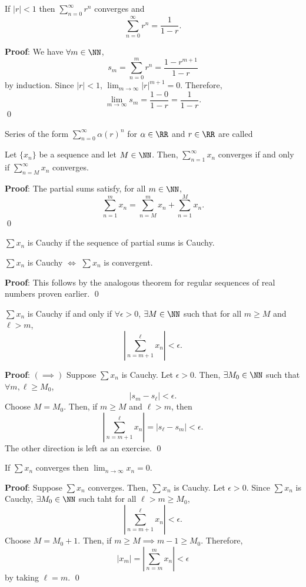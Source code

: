\begin{theorem}
If $|r| < 1$ then $\sum_{n=0}^\infty r^n$ converges and 
\[
\sum_{n=0}^\infty r^n = \frac{1}{1-r}.
\]
\end{theorem}
\textbf{Proof}: We have $\forall m\in \NN$, 
\[
s_m = \sum_{n=0}^m r^n = \frac{1-r^{m+1}}{1-r}
\]
by induction. Since $|r|<1$, $\lim_{m\to \infty} |r|^{m+1} = 0$. Therefore, 
\[
\lim_{m\to \infty} s_m = \frac{1-0}{1-r} = \frac{1}{1-r}.
\]\qed 

\begin{remark}
Series of the form $\sum_{n=0}^\infty \alpha (r)^{n}$ for $\alpha \in \RR$ and $r\in \RR$ are called 
\end{remark}

\begin{theorem}
Let $\{x_n\}$ be a sequence and let $M \in \NN$. Then, $\sum_{n=1}^\infty x_n$ converges if and only if $\sum_{n=M}^\infty x_n$ converges. 
\end{theorem}
\textbf{Proof}: The partial sums satisfy, for all $m\in \NN$, 
\[
\sum_{n=1}^m x_n = \sum_{n=M}^m x_n + \sum_{n=1}^M x_n.
\]
\qed 

\begin{definition}
$\sum x_n$ is Cauchy if the sequence of partial sums is Cauchy.
\end{definition}

\begin{theorem}
$\sum x_n$ is Cauchy $\iff$ $\sum x_n$ is convergent.
\end{theorem}
\textbf{Proof}: This follows by the analogous theorem for regular sequences of real numbers proven earlier. \qed

\begin{theorem}
$\sum x_n$ is Cauchy if and only if $\forall \epsilon>0$, $\exists M\in \NN$ such that for all $m \geq M$ and $\ell >m$,
\[
\left|\sum_{n=m+1}^\ell x_n\right| < \epsilon.
\]
\end{theorem}
\textbf{Proof}: $(\implies)$ Suppose $\sum x_n$ is Cauchy. Let $\epsilon>0$. Then, $\exists M_0\in \NN$ such that $\forall m,\ell \geq M_0$,
\[
|s_m - s_{\ell}| < \epsilon.
\]
Choose $M = M_0$. Then, if $m\geq M$ and $\ell >m$, then
\[
\left|\sum_{n=m+1}^\ell x_n\right| = |s_\ell -s_m| < \epsilon.
\]
The other direction is left as an exercise. \qed

\begin{theorem}
If $\sum x_n$ converges then $\lim_{n\to \infty} x_n = 0$.
\end{theorem}
\textbf{Proof}: Suppose $\sum x_n$ converges. Then, $\sum x_n$ is Cauchy. Let $\epsilon>0$. Since $\sum x_n$ is Cauchy, $\exists M_0 \in \NN$ such taht for all $\ell>m\geq M_0$, 
\[
\left|\sum_{n=m+1}^\ell x_n\right| < \epsilon.
\]
Choose $M = M_0 + 1$. Then, if $m \geq M \implies m-1\geq M_0$. Therefore, 
\[
|x_m| = \left|\sum_{n=m}^m x_n\right| < \epsilon
\]
by taking $\ell = m$. \qed 

